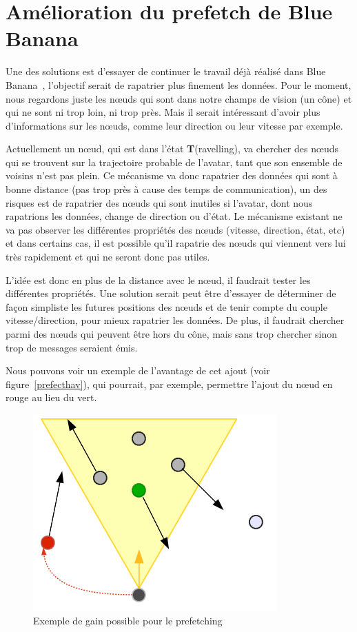 \documentclass[11pt,a4paper]{article}
\begin{document}
\newpage
\section{Amélioration du prefetch de Blue Banana}
Une des solutions est d'essayer de continuer le travail déjà réalisé dans Blue Banana~\cite{191}, l'objectif serait de rapatrier plus finement les données. Pour le moment, nous regardons juste les nœuds qui sont dans notre champs de vision (un cône) et qui ne sont ni trop loin, ni trop près. Mais il serait intéressant d'avoir plus d'informations sur les nœuds, comme leur direction ou leur vitesse par exemple. 
\par Actuellement un nœud, qui est dans l'état \textbf{T}(ravelling), va chercher des nœuds qui se trouvent sur la trajectoire probable de l'avatar, tant que son ensemble de voisins n'est pas plein. Ce mécanisme va donc rapatrier des données qui sont à bonne distance (pas trop près à cause des temps de communication), un des risques est de rapatrier des nœuds qui sont inutiles si l'avatar, dont nous rapatrions les données, change de direction ou d'état. Le mécanisme existant ne va pas observer les différentes propriétés des nœuds (vitesse, direction, état, etc) et dans certains cas, il est possible qu'il rapatrie des nœuds qui viennent vers lui très rapidement et qui ne seront donc pas utiles.
\par L'idée est donc en plus de la distance avec le nœud, il faudrait tester les différentes propriétés. Une solution serait peut être d'essayer de déterminer de façon simpliste les futures positions des nœuds et de tenir compte du couple vitesse/direction, pour mieux rapatrier les données. De plus, il faudrait chercher parmi des nœuds qui peuvent être hors du cône, mais sans trop chercher sinon trop de messages seraient émis.
\par  Nous pouvons voir un exemple de l'avantage de cet ajout (voir figure~\ref{prefecthav}), qui pourrait, par exemple, permettre l'ajout du nœud en rouge au lieu du vert.
	\begin{figure}[!h]
        \centering
        \includegraphics[scale=0.45]{./images/prefetchav.png}
        \caption{Exemple de gain possible pour le prefetching}
        \label{prefetchav}
        \end{figure}
\end{document}
